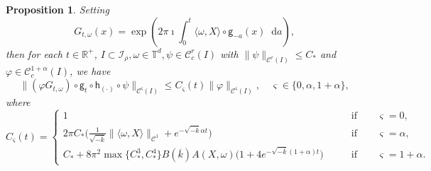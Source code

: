 \documentclass[11pt,letterpaper]{amsart}
\newcommand \cI {{\mathcal I}}
\newcommand \R {{ \mathbb R}}
\newcommand \T {{ \mathbb T}}
\newcommand \cC {{\mathscr{C}}}
\newcommand{\horo}{\mathsf{h}}
\newcommand{\geo}{\mathsf{g}}
\newcommand*{\diff}{\mathop{}\!\mathrm{d}}
\newtheorem {proposition}[theorem]{Proposition}
\theoremstyle{definition}
\begin{document}
\begin{proposition}\label{prop:G}
Setting 
\[
G_{t,\omega}(x)=\exp\left( 2\pi \imath \int_0^t \langle \omega, X\rangle\circ \geo_{-a}(x)\diff a  \right),
\]
then for each $t\in \R^+$, $ I\subset \cI_\rho, \omega \in \T^d, \psi\in \cC^r_c(I)$ with $\|\psi\|_{\cC^r(I)}\le C_*$ and $\varphi\in \cC^{1+\alpha}_c(I)$, we have
\[
 \|(\varphi G_{t,\omega})\circ \geo_t\circ \horo_{(\cdot)}\circ \psi \|_{\cC^{\varsigma}(I)}  \le C_\varsigma(t) \|\varphi\|_{\cC^\varsigma(I)}, \quad \varsigma \in \{0,\alpha, 1+\alpha\},
\]
where
\begin{equation}\label{eq:C(t)}
C_\varsigma(t)=\begin{cases}  1 \qquad &\text{if}\qquad  \varsigma=0,\\ 					   
					    2\pi C_*\big(\frac{1 }{\sqrt{-\overline k}}\|\langle \omega, X \rangle \|_{\cC^1} +e^{-\sqrt{-\overline k}\alpha t}\big) \qquad &\text{if} \qquad\varsigma=\alpha,\\
					   C_*+8\pi^2\max\{C_*^3,C_*^4\} B(\overline k)A(X,\omega)\big(1+4e^{-\sqrt{-\overline k}(1+\alpha)t}\big) \qquad &\text{if} \qquad\varsigma=1+\alpha.
		\end{cases}
\end{equation}

\end{proposition}
%
\end{document}
